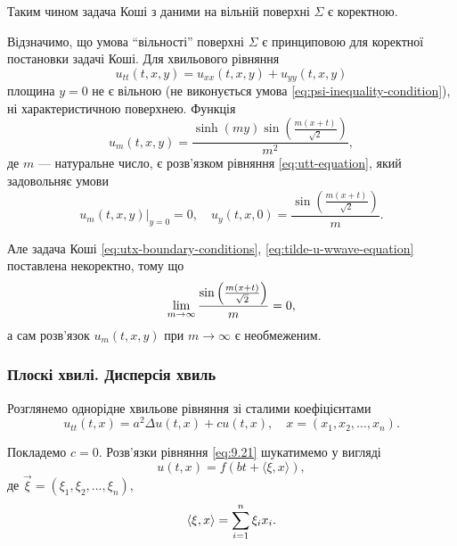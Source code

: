 Таким чином задача Коші з даними на вільній поверхні $\Sigma$ є коректною. \medskip

Відзначимо, що умова ``вільності'' поверхні $\Sigma$ є принциповою для коректної постановки задачі Коші. Для хвильового рівняння
\begin{equation}
    u_{tt}(t, x, y) = u_{xx}(t, x, y) + u_{yy}(t, x, y)
\end{equation}
площина $y = 0$ не є вільною (не виконується умова \eqref{eq:psi-inequality-condition}), ні характеристичною поверхнею. Функція
\begin{equation}
    u_m(t, x, y) = \frac{\sinh (m y) \sin \left( \frac{m (x + t)}{\sqrt{2}} \right)}{m^2},
\end{equation}
де $m$ --- натуральне число, є розв'язком рівняння \eqref{eq:utt-equation}, який задовольняє умови
\begin{equation}
    \left. u_m(t, x, y) \right|_{y = 0} = 0, \quad  u_y(t, x, 0)  = \frac{\sin \left( \frac{m (x + t)}{\sqrt{2}} \right)}{m}.
\end{equation}

Але задача Коші \eqref{eq:utx-boundary-conditions}, \eqref{eq:tilde-u-wwave-equation} поставлена некоректно, тому що
\begin{equation}
    \displaystyle\lim\limits_{m \to \infty} \frac{\sin \left( \frac{m (x + t)}{\sqrt{2}} \right)}{m} = 0, 
\end{equation}
а сам розв'язок $u_m(t, x, y)$ при $m \to \infty$ є необмеженим.

\subsubsection{Плоскі хвилі. Дисперсія хвиль}

Розглянемо однорідне хвильове рівняння зі сталими коефіцієнтами 
\begin{equation}
    \label{eq:9.21}
    u_{tt}(t, x) = a^2 \Delta u(t, x) + c u(t, x), \quad x = (x_1, x_2, \ldots, x_n).
\end{equation}

Покладемо $c = 0$. Розв'язки рівняння \eqref{eq:9.21} шукатимемо у вигляді
\begin{equation}
    \label{eq:9.22}
    u(t, x) = f (b t + \langle \xi, x \rangle),
\end{equation}
де $\vec \xi = (\xi_1, \xi_2, \ldots, \xi_n)$,
\begin{equation}
    \langle \xi, x \rangle = \Sum_{i = 1}^n \xi_i x_i.
\end{equation}


